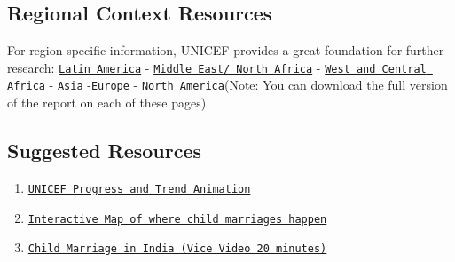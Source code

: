 \documentclass[10pt, letterpaper]{article}
\begin{document}
\subsection{Regional Context Resources}

For region specific information, UNICEF provides a great foundation for
further research:
\texttt{\href{https://data.unicef.org/resources/profile-of-child-marriage-and-early-unions-in-latin-america-and-the-caribbean/}{{Latin
America}}} -
\texttt{\href{https://data.unicef.org/resources/child-marriage-in-mena/}{{Middle
East/ North Africa}}} -
\texttt{\href{https://data.unicef.org/resources/statistical-snapshot-child-marriage-west-central-africa/}{{West
and Central Africa}}} -
\texttt{\href{https://data.unicef.org/resources/ending-child-marriage-a-profile-of-progress-in-india/}{{Asia}}}
-\texttt{\href{https://data.unicef.org/resources/risk-factors-associated-practice-child-marriage-among-roma-girls-serbia/}{{Europe}}} - \texttt{\href{https://www.cbsnews.com/news/child-marriage-united-states-donna-pollard/\#:~:text=generations\%22\%20\%2D\%20CBS\%20News-,Child\%20marriage\%20is\%20\%22extremely\%20prevalent\%22\%20in\%20U.S.\%3A\%20\%22,The\%20cycle\%20perpetuates\%20across\%20generations\%22\&text=In\%20the\%20United\%20States\%2C\%20more,to\%20data\%20analyzed\%20by\%20Frontline.\%20\%20https://www.ctvnews.ca/canada/child-marriage-in-canada-means-country-s-efforts-to-end-it-abroad-are-insincere-researcher-1.4467778\#:~:text=CANADIAN\%20LAW\%20ALLOWS\%20CHILDREN\%20TO\%20WED\%20WITH\%20PARENTAL\%20CONSENT\&text=Marriage\%20laws\%20vary\%20among\%20the,consent\%20or\%20a\%20court\%20order.}{{North
America}}}(Note: You can download the full version of the report on each of these
pages) 

\subsection{Suggested Resources}

\begin{enumerate}
\def\labelenumi{\arabic{enumi}.}
\item
  
  \texttt{\href{https://data.unicef.org/resources/end-child-marriage-progress-and-trends-animated-video/}{{UNICEF
  Progress and Trend Animation}}}
  
\item
  
  \texttt{\href{https://www.girlsnotbrides.org/where-does-it-happen/atlas/}{{Interactive
  Map of where child marriages happen}}}
  
\item
  
  \texttt{\href{https://www.youtube.com/watch?v=pttHSJCl4Ks\&ab_channel=VICEAsia}{{Child
  Marriage in India (Vice Video 20 minutes)}}}
  
\end{enumerate}
\end{document}
